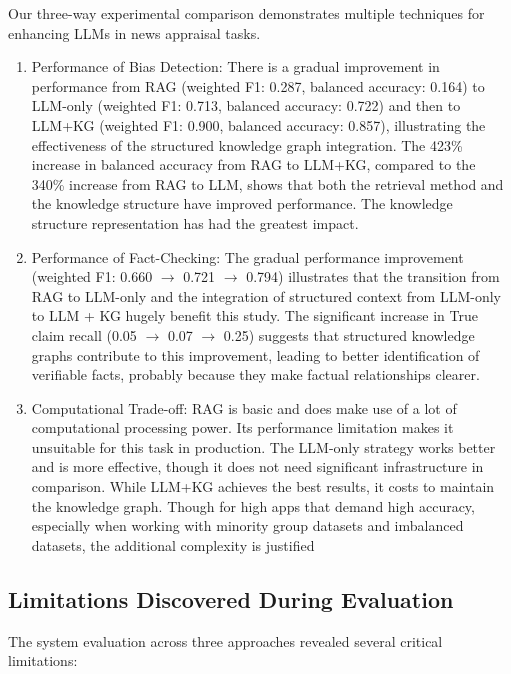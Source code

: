 \documentclass[11pt]{article}
\begin{document}
Our three-way experimental comparison demonstrates multiple techniques for enhancing LLMs in news appraisal tasks.
\begin{enumerate}
    

\item{Performance of  Bias Detection:} There is a gradual improvement in performance from RAG (weighted F1: 0.287, balanced accuracy: 0.164) to LLM-only (weighted F1: 0.713, balanced accuracy: 0.722) and then to LLM+KG (weighted F1: 0.900, balanced accuracy: 0.857), illustrating the effectiveness of the structured knowledge graph integration. The 423\% increase in balanced accuracy from RAG to LLM+KG, compared to the 340\% increase from RAG to LLM, shows that both the retrieval method and the knowledge structure have improved performance. The knowledge structure representation has had the greatest impact.

\item{Performance of Fact-Checking:} The gradual performance improvement (weighted F1: 0.660 $\rightarrow$ 0.721 $\rightarrow$ 0.794) illustrates that the transition from RAG to LLM-only and the integration of structured context from LLM-only to LLM + KG hugely benefit this study. The significant increase in True claim recall (0.05 $\rightarrow$ 0.07 $\rightarrow$ 0.25) suggests that structured knowledge graphs contribute to this improvement, leading to better identification of verifiable facts, probably because they make factual relationships clearer.

\item{Computational Trade-off:}
RAG is basic and does make use of a lot of computational processing power. Its performance limitation makes it unsuitable for this task in production. The LLM-only strategy works better and is more effective, though it does not need significant infrastructure in comparison. While LLM+KG achieves the best results, it costs to maintain the knowledge graph. Though for high apps that demand high accuracy, especially when working with minority group datasets and imbalanced datasets, the additional complexity is justified
\end{enumerate}

\subsection{Limitations Discovered During Evaluation}
The system evaluation across three approaches revealed several critical limitations:
\end{document}
